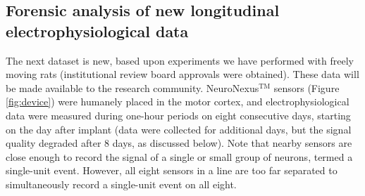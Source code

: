 \documentclass[journal]{IEEEtran}
\begin{document}
%
%


\subsection{Forensic analysis of new longitudinal electrophysiological data\label{sec:forensics}}

The next dataset is new, based upon experiments we have performed with freely moving rats (institutional review board approvals were obtained). These data will be made available to the research community. NeuroNexus$^{\mbox{TM}}$ sensors (Figure \ref{fig:device}) were humanely placed in the motor cortex, and electrophysiological data were measured during one-hour periods on eight consecutive days, starting on the day after implant (data were collected for additional days, but the signal quality degraded after 8 days, as discussed below). Note that nearby sensors are close enough to record the signal of a single or small group of neurons, termed a single-unit event. However, all eight sensors in a line are too far separated to simultaneously record a single-unit event on all eight.
\end{document}
